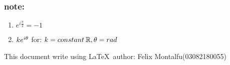 \documentclass[a4paper]{article}
\begin{document}
    \subsubsection*{note: }
    \begin{enumerate}[I]
        \item $e^{i\frac{\pi}{2}} = -1$
        \item $ke^{i\theta}\\$
        for: $k = constant \hspace*{2px} \mathbb{R}, \theta = rad\\$
    \end{enumerate}
    This document write using \LaTeX \ author: Felix Montalfu(03082180055) 
\end{document}
